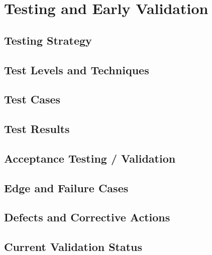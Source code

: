 \chapter{Testing and Early Validation}
\section{Testing Strategy}
\section{Test Levels and Techniques}
\section{Test Cases}
\section{Test Results}
\section{Acceptance Testing / Validation}
\section{Edge and Failure Cases}
\section{Defects and Corrective Actions}
\section{Current Validation Status}

